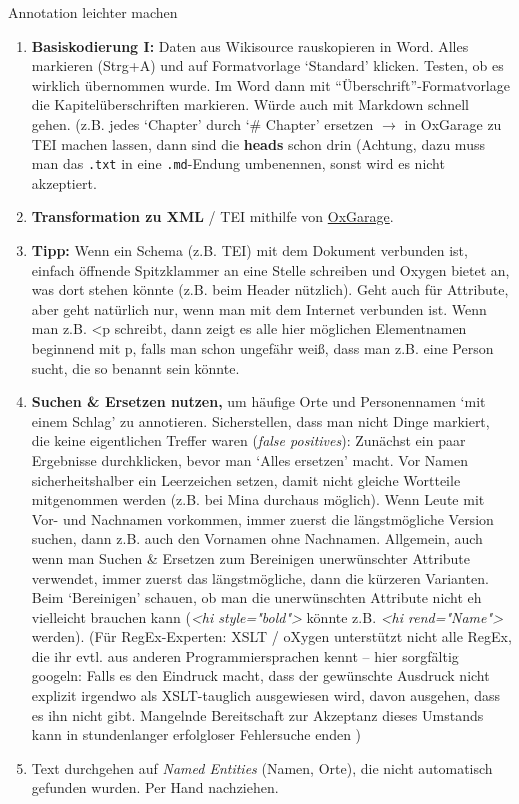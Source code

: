 \begin{frame}[allowframebreaks]{Annotation leichter machen}
\begin{enumerate}
    \item \textbf{Basiskodierung I:} Daten aus Wikisource rauskopieren in Word. Alles markieren (Strg+A) und auf Formatvorlage `Standard' klicken. Testen, ob es wirklich übernommen wurde. Im Word dann mit ``Überschrift''-Formatvorlage die Kapitelüberschriften markieren. Würde auch mit Markdown schnell gehen. 
    (z.B. jedes `Chapter' durch `\# Chapter' ersetzen $\to$ in OxGarage zu TEI machen lassen, dann sind die \textbf{heads} schon drin (Achtung, dazu muss man das \texttt{.txt} in eine \texttt{.md}-Endung umbenennen, sonst wird es nicht akzeptiert.
    \item \textbf{Transformation zu XML} / TEI mithilfe von \href{http://oxgarage.tei-c.org/#}{OxGarage}.
    \item \textbf{Tipp:} Wenn ein Schema (z.B. TEI) mit dem Dokument verbunden ist, einfach öffnende Spitzklammer an eine Stelle schreiben und Oxygen bietet an, was dort stehen könnte (z.B. beim Header nützlich). Geht auch für Attribute, aber geht natürlich nur, wenn man mit dem Internet verbunden ist. Wenn man z.B. <p schreibt, dann zeigt es alle hier möglichen Elementnamen beginnend mit p, falls man schon ungefähr weiß, dass man z.B. eine Person sucht, die so benannt sein könnte.
    \item \textbf{Suchen \& Ersetzen nutzen,} um häufige Orte und Personennamen `mit einem Schlag' zu annotieren. Sicherstellen, dass man nicht Dinge markiert, die keine eigentlichen Treffer waren (\emph{false positives}): Zunächst ein paar Ergebnisse durchklicken, bevor man `Alles ersetzen' macht. Vor Namen sicherheitshalber ein Leerzeichen setzen, damit nicht gleiche Wortteile mitgenommen werden (z.B. bei Mina durchaus möglich). Wenn Leute mit Vor- und Nachnamen vorkommen, immer zuerst die längstmögliche Version suchen, dann z.B. auch den Vornamen ohne Nachnamen. Allgemein, auch wenn man Suchen \& Ersetzen zum Bereinigen unerwünschter Attribute verwendet, immer zuerst das längstmögliche, dann die kürzeren Varianten. Beim `Bereinigen' schauen, ob man die unerwünschten Attribute nicht eh vielleicht brauchen kann (\emph{<hi style="bold">} könnte z.B. \emph{<hi rend="Name">} werden). (Für RegEx-Experten: XSLT / oXygen unterstützt nicht alle RegEx, die ihr evtl. aus anderen Programmiersprachen kennt -- hier sorgfältig googeln: Falls es den Eindruck macht, dass der gewünschte Ausdruck nicht explizit irgendwo als XSLT-tauglich ausgewiesen wird, davon ausgehen, dass es ihn nicht gibt. Mangelnde Bereitschaft zur Akzeptanz dieses Umstands kann in stundenlanger erfolgloser Fehlersuche enden \faSmileO )
    \item Text durchgehen auf \emph{Named Entities} (Namen, Orte), die nicht automatisch gefunden wurden. Per Hand nachziehen.
\end{enumerate}

\end{frame}



